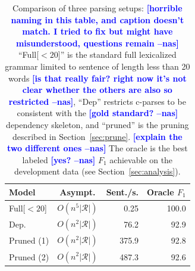 \documentclass[11pt,letterpaper]{article}
\newcommand{\rules}{\mathcal{R}}
\newcommand{\nascomment}[1]{\textcolor{blue}{\bf \small [#1 --nas]}}
\begin{document}






\begin{table}
  \centering
  \small
  \hspace*{-0.3cm}
  \begin{tabular}{|l|crr|}
    \hline
    Model & Asympt. & Sent./s. & Oracle $F_1$  \\
    \hline
    \hline
    Full[$< 20$] & $O(n^5|\rules|)$ &  0.25  & 100.0  \\
    Dep.         & $O(n^2|\rules|)$ &  76.2  & 92.9    \\
    Pruned (1)   & $O(n^2|\rules|)$ &  375.9 & 92.8    \\
    Pruned (2)   & $O(n^2|\rules|)$ &  487.3 & 92.6 \\
    \hline
  \end{tabular}
  \label{tab:alg-oracle}
  \caption{Comparison of three parsing setups: 
\nascomment{horrible naming in this table, and caption doesn't match.
I tried to fix but might have misunderstood, questions remain}
    ``Full[$<20$]'' is the standard full lexicalized grammar limited to sentence of length
    less than 20 words \nascomment{is that really fair?  right now
      it's not clear whether the others are also so restricted},
    ``Dep'' restricts c-parses to be consistent with the
    \nascomment{gold standard?} dependency skeleton, and ``pruned'' is the pruning described in
    Section~\ref{sec:prune}. \nascomment{explain the two different
      ones} The oracle is the best labeled \nascomment{yes?} $F_1$ achievable on the
    development data (see Section~\ref{sec:analysis}).}
\end{table}
\end{document}
